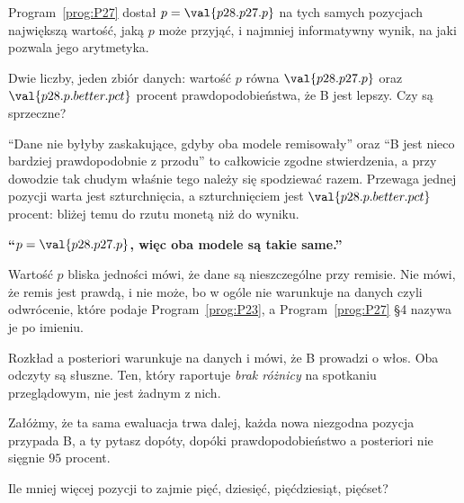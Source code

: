 \begin{fr}
Program~\ref{prog:P27} dostał $p = \val{p28.p27.p}$ na tych samych pozycjach
\dash{} największą wartość, jaką $p$ może przyjąć, i najmniej informatywny
wynik, na jaki pozwala jego arytmetyka.

Dwie liczby, jeden zbiór danych: wartość $p$ równa $\val{p28.p27.p}$ oraz
$\val{p28.p.better.pct}$ procent prawdopodobieństwa, że B jest lepszy. Czy są
sprzeczne?
\dotline
\nextframe
\end{fr}

\begin{fr}

\enquote{Dane nie byłyby zaskakujące, gdyby oba modele remisowały} oraz
\enquote{B jest nieco bardziej prawdopodobnie z przodu} to całkowicie zgodne
stwierdzenia, a przy dowodzie tak chudym właśnie tego należy się spodziewać
razem. Przewaga jednej pozycji warta jest szturchnięcia, a szturchnięciem jest
$\val{p28.p.better.pct}$ procent: bliżej temu do rzutu monetą niż do wyniku.

\begin{trapbox}
\textbf{\enquote{$p = \val{p28.p27.p}$, więc oba modele są takie same.}}

Wartość $p$ bliska jedności mówi, że dane są nieszczególne przy remisie. Nie
mówi, że remis jest prawdą, i nie może, bo w ogóle nie warunkuje na danych
\dash{} czyli odwrócenie, które podaje Program~\ref{prog:P23}, a
Program~\ref{prog:P27} §4 nazywa je po imieniu.

Rozkład a posteriori warunkuje na danych i mówi, że B prowadzi o włos. Oba
odczyty są słuszne. Ten, który raportuje \emph{brak różnicy} na spotkaniu
przeglądowym, nie jest żadnym z nich.
\end{trapbox}
\end{fr}

\begin{fr}
Załóżmy, że ta sama ewaluacja trwa dalej, każda nowa niezgodna pozycja
przypada B, a ty pytasz dopóty, dopóki prawdopodobieństwo a posteriori nie
sięgnie $95$ procent.

Ile mniej więcej pozycji to zajmie \dash{} pięć, dziesięć, pięćdziesiąt,
pięćset?
\dotline
\nextframe
\end{fr}

